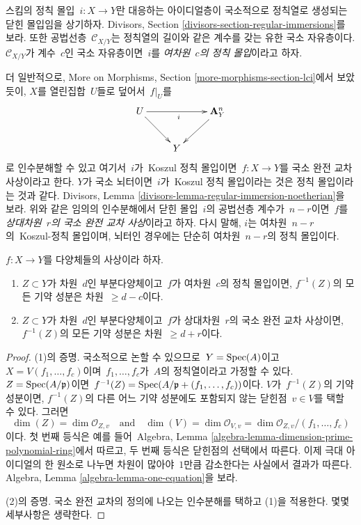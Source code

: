 \noindent
스킴의 정칙 몰입\  $i : X \to Y$란 대응하는 아이디얼층이 국소적으로
정칙열로 생성되는 닫힌 몰입임을 상기하자. Divisors, Section
\ref{divisors-section-regular-immersions}를 보라.
또한 공법선층\  $\mathcal{C}_{X/Y}$는 정칙열의 길이와 같은 계수를 갖는
유한 국소 자유층이다. $\mathcal{C}_{X/Y}$가 계수\  $c$인 국소 자유층이면\ 
$i$를 {\it 여차원\  $c$의 정칙 몰입}이라고 하자.

\medskip\noindent
더 일반적으로, More on Morphisms, Section
\ref{more-morphisms-section-lci}에서 보았듯이, $X$를 열린집합\  $U$들로
덮어서\  $f|_U$를
$$
\xymatrix{
U \ar[rr]_i \ar[rd] & & \mathbf{A}^n_Y \ar[ld] \\
& Y
}
$$
로 인수분해할 수 있고 여기서\  $i$가\  Koszul 정칙 몰입이면\ 
$f : X \to Y$를 국소 완전 교차 사상이라고 한다. $Y$가 국소 뇌터이면\ 
$i$가\  Koszul 정칙 몰입이라는 것은 정칙 몰입이라는 것과 같다.
Divisors, Lemma
\ref{divisors-lemma-regular-immersion-noetherian}을 보라.
위와 같은 임의의 인수분해에서 닫힌 몰입\  $i$의 공법선층 계수가\  $n - r$이면\ 
$f$를 {\it 상대차원\  $r$의 국소 완전 교차 사상}이라고 하자. 다시 말해,
$i$는 여차원\  $n - r$의\  Koszul-정칙 몰입이며, 뇌터인 경우에는 단순히
여차원\  $n - r$의 정칙 몰입이다.

\begin{lemma}
\label{lemma-pullback-by-regular-immersion}
$f : X \to Y$를 다양체들의 사상이라 하자.
\begin{enumerate}
\item $Z \subset Y$가 차원\  $d$인 부분다양체이고\  $f$가 여차원\  $c$의
정칙 몰입이면, $f^{-1}(Z)$의 모든 기약 성분은 차원\  $\geq d - c$이다.
\item $Z \subset Y$가 차원\  $d$인 부분다양체이고\  $f$가 상대차원\  $r$의
국소 완전 교차 사상이면, $f^{-1}(Z)$의 모든 기약 성분은
차원\  $\geq d + r$이다.
\end{enumerate}
\end{lemma}

\begin{proof}
(1)의 증명. 국소적으로 논할 수 있으므로\ 
$Y = \mathop{\mathrm{Spec}}(A)$이고\  $X = V(f_1, \ldots, f_c)$이며\ 
$f_1, \ldots, f_c$가\  $A$의 정칙열이라고 가정할 수 있다.
$Z = \mathop{\mathrm{Spec}}(A/\mathfrak p)$이면\ 
$f^{-1}(Z) = \mathop{\mathrm{Spec}}(A/\mathfrak p + (f_1, \ldots, f_c))$이다.
$V$가\  $f^{-1}(Z)$의 기약 성분이면, $f^{-1}(Z)$의 다른 어느 기약 성분에도
포함되지 않는 닫힌점\  $v \in V$를 택할 수 있다. 그러면
$$
\dim(Z) = \dim \mathcal{O}_{Z, v}
\quad\text{and}\quad
\dim(V) = \dim \mathcal{O}_{V, v} = \dim \mathcal{O}_{Z, v}/(f_1, \ldots, f_c)
$$
이다. 첫 번째 등식은 예를 들어\  Algebra, Lemma
\ref{algebra-lemma-dimension-prime-polynomial-ring}에서 따르고,
두 번째 등식은 닫힌점의 선택에서 따른다.
이제 극대 아이디얼의 한 원소로 나누면 차원이 많아야\  $1$만큼 감소한다는
사실에서 결과가 따른다. Algebra, Lemma
\ref{algebra-lemma-one-equation}을 보라.

\medskip\noindent
(2)의 증명. 국소 완전 교차의 정의에 나오는 인수분해를 택하고 (1)을
적용한다. 몇몇 세부사항은 생략한다.
\end{proof}

